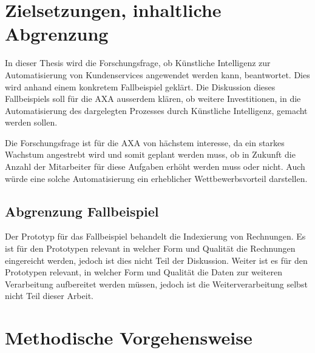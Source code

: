 \documentclass[12pt, twoside, table]{extarticle}
\begin{document}
\newpage
\section{Zielsetzungen, inhaltliche Abgrenzung}


In dieser Thesis wird die Forschungsfrage, ob Künstliche Intelligenz zur Automatisierung von Kundenservices angewendet werden kann, beantwortet. Dies wird anhand einem konkretem Fallbeispiel geklärt. Die Diskussion dieses Fallbeispiels soll für die AXA ausserdem klären, ob weitere Investitionen, in die Automatisierung des dargelegten Prozesses durch Künstliche Intelligenz, gemacht werden sollen.

Die Forschungsfrage ist für die AXA von hächstem interesse, da ein starkes Wachstum angestrebt wird und somit geplant werden muss, ob in Zukunft die Anzahl der Mitarbeiter für diese Aufgaben erhöht werden muss oder nicht. Auch würde eine solche Automatisierung ein erheblicher Wettbewerbsvorteil darstellen.

\subsection{Abgrenzung Fallbeispiel}

Der Prototyp für das Fallbeispiel behandelt die Indexierung von Rechnungen. Es ist für den Prototypen relevant in welcher Form und Qualität die Rechnungen eingereicht werden, jedoch ist dies nicht Teil der Diskussion. Weiter ist es für den Prototypen relevant, in welcher Form und Qualität die Daten zur weiteren Verarbeitung aufbereitet werden müssen, jedoch ist die Weiterverarbeitung selbst nicht Teil dieser Arbeit.


\newpage
\section{Methodische Vorgehensweise}
\end{document}
